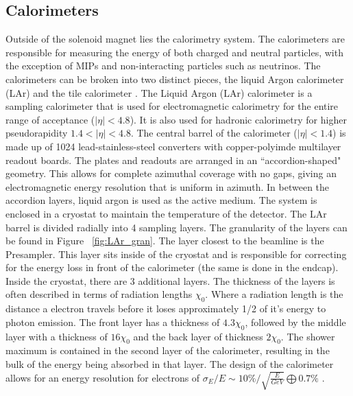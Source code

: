 \subsection{Calorimeters}\label{ssec:calo}




Outside of the solenoid magnet lies the calorimetry system. The calorimeters are responsible for measuring the energy of both charged and neutral particles, with the exception of MIPs and non-interacting particles such as neutrinos. The calorimeters can be broken into two distinct pieces, the liquid Argon calorimeter (LAr)\cite{CERN-LHCC-96-041} and the tile calorimeter \cite{CERN-LHCC-96-042}. \linebreak
\indent The Liquid Argon (LAr) calorimeter is a sampling calorimeter that is used for electromagnetic calorimetry for the entire range of acceptance (${|\eta{}|<4.8}$). It is also used for hadronic calorimetry for higher pseudorapidity ${1.4<|\eta{}|<4.8}$. The central barrel of the calorimeter (${|\eta{}| < 1.4}$) is made up of 1024 lead-stainless-steel converters with copper-polyimde multilayer readout boards. The plates and readouts are arranged in an ``accordion-shaped" geometry. This allows for complete azimuthal coverage with no gaps, giving an electromagnetic energy resolution that is uniform in azimuth. In between the accordion layers, liquid argon is used as the active medium. The system is enclosed in a cryostat to maintain the temperature of the detector. The LAr barrel is divided radially into 4 sampling layers. The granularity of the layers can be found in Figure ~\ref{fig:LAr_gran}. The layer closest to the beamline is the Presampler. This layer sits inside of the cryostat and is responsible for  correcting for the energy loss in front of the calorimeter (the same is done in the endcap). Inside the cryostat, there are 3 additional layers. The thickness of the layers is often described in terms of radiation lengths ${\chi_{0}}$. Where a radiation length is the distance a electron travels before it loses approximately 1/2 of it's energy to photon emission.  The front layer has a thickness of ${4.3\chi_{0}}$, followed by the middle layer with a thickness of ${16\chi_{0}}$ and the back layer of thickness ${2\chi_{0}}$. The shower maximum is contained in the second layer of the calorimeter, resulting in the bulk of the energy being absorbed in that layer. The design of the calorimeter allows for an energy resolution for electrons of ${\sigma_{E}/E \sim 10\%/\sqrt{\frac{E}{GeV}} \bigoplus 0.7\%}$ \cite{Aad:2014nim}.\linebreak 

